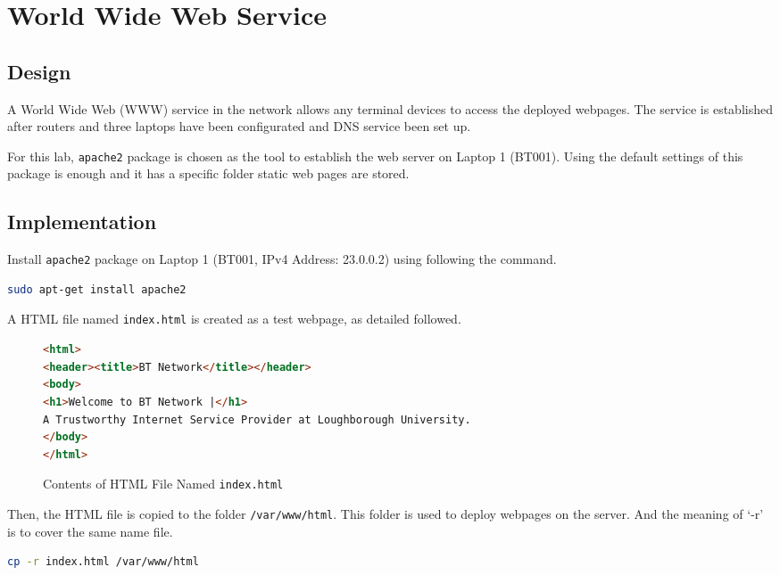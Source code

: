 \section{World Wide Web Service}
\label{sec:web}

\subsection{Design}

A World Wide Web (WWW) service\citep{rfc1630}\citep{rfc2616} in the network allows any terminal devices to access the deployed webpages. The service is established after routers and three laptops have been configurated and DNS service been set up.

For this lab, \texttt{apache2} package is chosen as the tool to establish the web server on Laptop 1 (BT001). 
Using the default settings of this package is enough and it has a specific folder static web pages are stored. 


\subsection{Implementation}

Install \texttt{apache2} package on Laptop 1 (BT001, IPv4 Address: 23.0.0.2) using following the command.

\begin{lstlisting}[language=sh]
sudo apt-get install apache2

\end{lstlisting}

A HTML file named \texttt{index.html} is created as a test webpage, as detailed followed.

\begin{figure*}[ht!]
\begin{lstlisting}[language=html]
<html>
<header><title>BT Network</title></header>
<body>
<h1>Welcome to BT Network |</h1>
A Trustworthy Internet Service Provider at Loughborough University.
</body>
</html>
\end{lstlisting}
\caption{Contents of HTML File Named \texttt{index.html}}
\end{figure*}

Then, the HTML file is copied to the folder \texttt{/var/www/html}. This folder is used to deploy webpages on the server. And the meaning of ‘-r’ is to cover the same name file. 

\begin{lstlisting}[language=sh]
cp -r index.html /var/www/html
\end{lstlisting}

